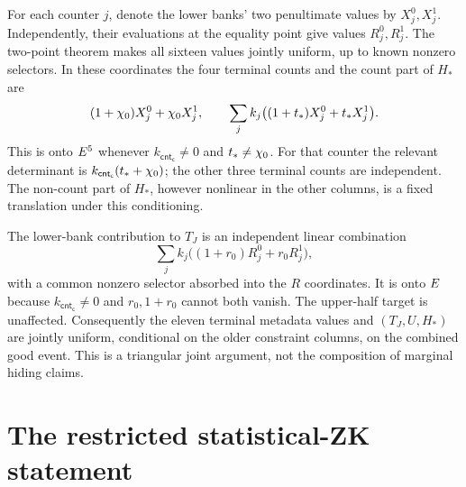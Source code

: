 \documentclass[11pt]{article}
\begin{document}
For each counter $j$, denote the lower banks' two penultimate values by $X_j^0,X_j^1$. Independently, their evaluations at the equality point give values $R_j^0,R_j^1$. The two-point theorem makes all sixteen values jointly uniform, up to known nonzero selectors. In these coordinates the four terminal counts and the count part of $H_*$ are
\[
 (1+\chi_0)X_j^0+\chi_0X_j^1,
 \qquad
 \sum_j k_j\bigl((1+t_*)X_j^0+t_*X_j^1\bigr).
\]
This is onto $E^5$ whenever $k_{\mathsf{cnt_c}}\ne0$ and $t_*\ne\chi_0$. For that counter the relevant determinant is $k_{\mathsf{cnt_c}}(t_*+\chi_0)$; the other three terminal counts are independent. The non-count part of $H_*$, however nonlinear in the other columns, is a fixed translation under this conditioning.

The lower-bank contribution to $T_J$ is an independent linear combination
\[
 \sum_j k_j\bigl((1+r_0)R_j^0+r_0R_j^1\bigr),
\]
with a common nonzero selector absorbed into the $R$ coordinates. It is onto $E$ because $k_{\mathsf{cnt_c}}\ne0$ and $r_0,1+r_0$ cannot both vanish. The upper-half target is unaffected. Consequently the eleven terminal metadata values and $(T_J,U,H_*)$ are jointly uniform, conditional on the older constraint columns, on the combined good event. This is a triangular joint argument, not the composition of marginal hiding claims.

\section{The restricted statistical-ZK statement}
\end{document}

